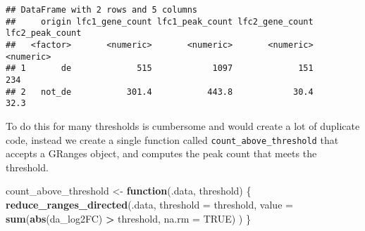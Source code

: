 \documentclass[
  9pt,
  a4paper,
]{extarticle}
\newenvironment{Shaded}{\begin{snugshade}}{\end{snugshade}}
\newcommand{\ControlFlowTok}[1]{\textcolor[rgb]{0.13,0.29,0.53}{\textbf{#1}}}
\newcommand{\DataTypeTok}[1]{\textcolor[rgb]{0.13,0.29,0.53}{#1}}
\newcommand{\DecValTok}[1]{\textcolor[rgb]{0.00,0.00,0.81}{#1}}
\newcommand{\KeywordTok}[1]{\textcolor[rgb]{0.13,0.29,0.53}{\textbf{#1}}}
\newcommand{\NormalTok}[1]{#1}
\newcommand{\OperatorTok}[1]{\textcolor[rgb]{0.81,0.36,0.00}{\textbf{#1}}}
\newcommand{\OtherTok}[1]{\textcolor[rgb]{0.56,0.35,0.01}{#1}}
\newcommand{\StringTok}[1]{\textcolor[rgb]{0.31,0.60,0.02}{#1}}
\begin{document}
\begin{Shaded}
\end{Shaded}

\begin{verbatim}
## DataFrame with 2 rows and 5 columns
##     origin lfc1_gene_count lfc1_peak_count lfc2_gene_count lfc2_peak_count
##   <factor>       <numeric>       <numeric>       <numeric>       <numeric>
## 1       de             515            1097             151             234
## 2   not_de           301.4           443.8            30.4            32.3
\end{verbatim}

To do this for many thresholds is cumbersome and would create a lot of
duplicate code, instead we create a single function called
\texttt{count\_above\_threshold} that accepts a GRanges object, and computes the peak
count that meets the threshold.

\begin{Shaded}
\begin{Highlighting}[]
\NormalTok{count_above_threshold <-}\StringTok{ }\ControlFlowTok{function}\NormalTok{(.data, threshold) \{}
  \KeywordTok{reduce_ranges_directed}\NormalTok{(.data,}
                         \DataTypeTok{threshold =}\NormalTok{ threshold,}
                         \DataTypeTok{value =} \KeywordTok{sum}\NormalTok{(}\KeywordTok{abs}\NormalTok{(da_log2FC) }\OperatorTok{>}\StringTok{ }\NormalTok{threshold, }\DataTypeTok{na.rm =} \OtherTok{TRUE}\NormalTok{)}
\NormalTok{  )}
\NormalTok{\}}
\end{Highlighting}
\end{Shaded}
\end{document}
